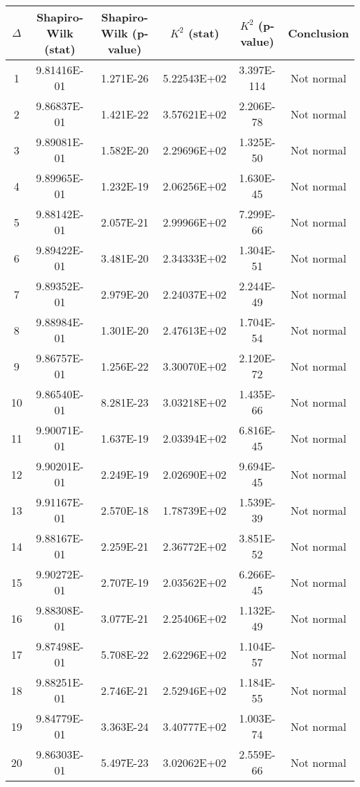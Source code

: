 \begin{table}[h]
	\begin{tabular}{|c|c|c|c|c|c|}
		\hline
		$\Delta$ &  Shapiro-Wilk (stat) & Shapiro-Wilk (p-value) & $K^2$ (stat) & $K^2$ (p-value) & Conclusion\\\hline
		\hline
		1 & 9.81416E-01 & 1.271E-26 & 5.22543E+02 & 3.397E-114 & Not normal\\\hline
		2 & 9.86837E-01 & 1.421E-22 & 3.57621E+02 & 2.206E-78 & Not normal\\\hline
		3 & 9.89081E-01 & 1.582E-20 & 2.29696E+02 & 1.325E-50 & Not normal\\\hline
		4 & 9.89965E-01 & 1.232E-19 & 2.06256E+02 & 1.630E-45 & Not normal\\\hline
		5 & 9.88142E-01 & 2.057E-21 & 2.99966E+02 & 7.299E-66 & Not normal\\\hline
		6 & 9.89422E-01 & 3.481E-20 & 2.34333E+02 & 1.304E-51 & Not normal\\\hline
		7 & 9.89352E-01 & 2.979E-20 & 2.24037E+02 & 2.244E-49 & Not normal\\\hline
		8 & 9.88984E-01 & 1.301E-20 & 2.47613E+02 & 1.704E-54 & Not normal\\\hline
		9 & 9.86757E-01 & 1.256E-22 & 3.30070E+02 & 2.120E-72 & Not normal\\\hline
		10 & 9.86540E-01 & 8.281E-23 & 3.03218E+02 & 1.435E-66 & Not normal\\\hline
		11 & 9.90071E-01 & 1.637E-19 & 2.03394E+02 & 6.816E-45 & Not normal\\\hline
		12 & 9.90201E-01 & 2.249E-19 & 2.02690E+02 & 9.694E-45 & Not normal\\\hline
		13 & 9.91167E-01 & 2.570E-18 & 1.78739E+02 & 1.539E-39 & Not normal\\\hline
		14 & 9.88167E-01 & 2.259E-21 & 2.36772E+02 & 3.851E-52 & Not normal\\\hline
		15 & 9.90272E-01 & 2.707E-19 & 2.03562E+02 & 6.266E-45 & Not normal\\\hline
		16 & 9.88308E-01 & 3.077E-21 & 2.25406E+02 & 1.132E-49 & Not normal\\\hline
		17 & 9.87498E-01 & 5.708E-22 & 2.62296E+02 & 1.104E-57 & Not normal\\\hline
		18 & 9.88251E-01 & 2.746E-21 & 2.52946E+02 & 1.184E-55 & Not normal\\\hline
		19 & 9.84779E-01 & 3.363E-24 & 3.40777E+02 & 1.003E-74 & Not normal\\\hline
		20 & 9.86303E-01 & 5.497E-23 & 3.02062E+02 & 2.559E-66 & Not normal\\\hline

\end{tabular}
\end{table}

